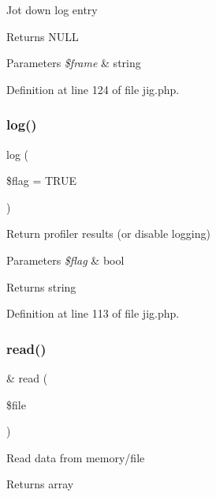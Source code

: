 Jot down log entry \begin{DoxyReturn}{Returns}
N\+U\+LL 
\end{DoxyReturn}

\begin{DoxyParams}{Parameters}
{\em \$frame} & string \\
\hline
\end{DoxyParams}


Definition at line 124 of file jig.\+php.

\hypertarget{class_d_b_1_1_jig_a92faa80a7077936bd630e5dcc7bb4a64}{}\label{class_d_b_1_1_jig_a92faa80a7077936bd630e5dcc7bb4a64} 
\subsubsection{\texorpdfstring{log()}{log()}}
{\footnotesize\ttfamily log (\begin{DoxyParamCaption}\item[{}]{\$flag = {\ttfamily TRUE} }\end{DoxyParamCaption})}

Return profiler results (or disable logging) 
\begin{DoxyParams}{Parameters}
{\em \$flag} & bool \\
\hline
\end{DoxyParams}
\begin{DoxyReturn}{Returns}
string 
\end{DoxyReturn}


Definition at line 113 of file jig.\+php.

\hypertarget{class_d_b_1_1_jig_a49e4883f63642e3c6593545d87feae4a}{}\label{class_d_b_1_1_jig_a49e4883f63642e3c6593545d87feae4a} 
\subsubsection{\texorpdfstring{read()}{read()}}
{\footnotesize\ttfamily \& read (\begin{DoxyParamCaption}\item[{}]{\$file }\end{DoxyParamCaption})}

Read data from memory/file \begin{DoxyReturn}{Returns}
array 
\end{DoxyReturn}

